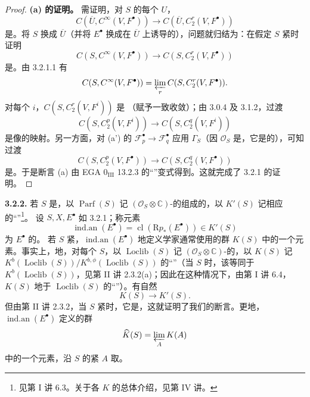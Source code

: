 \begin{proof}
\textbf{(a) 的证明。} 需证明，对 $S$ 的每个 $U$，
\[C(\overline U,C^\infty(V,F^\bullet))\longrightarrow C(\overline U,C_2^r(V,F^\bullet))\]
是。将 $S$ 换成 $\overline U$（并将 $E^\bullet$ 换成在 $\overline U$ 上诱导的），问题就归结为：在假定 $S$ 紧时证明
\[C(S,C^\infty(V,F^\bullet))\longrightarrow C(S,C_2^r(V,F^\bullet))\]
是。由 3.2.1.1 有
\[C(S,C^\infty(V,F^\bullet))=\varprojlim_r C(S,C_2^r(V,F^\bullet)).\]
对每个 $i$，$C(S,C_2^r(V,F^i))$ 是 （赋予一致收敛）；由 3.0.4 及 3.1.2，过渡
\[C(S,C_2^p(V,F^i))\longrightarrow C(S,C_2^q(V,F^i))\]
是像的映射。另一方面，对 (a') 的 $\mathcal F_p^\bullet\to\mathcal F_q^\bullet$ 应用 $\Gamma_S$（因 $\mathcal O_S$ 是，它是的），可知过渡
\[C(S,C_2^p(V,F^\bullet))\longrightarrow C(S,C_2^q(V,F^\bullet))\]
是。于是断言 (a) 由 EGA $0_{\mathrm{III}}$ 13.2.3 的“”变式得到。这就完成了 3.2.1 的证明。
\end{proof}

\textbf{3.2.2.} 若 $S$ 是，以 $\operatorname{Parf}(S)$ 记 $(\mathcal O_S\otimes\mathbb C)$-的组成的，以 $K'(S)$ 记相应的“”\footnote{见第 I 讲 6.3。关于各 $K$ 的总体介绍，见第 IV 讲。}。
设 $S,X,E^\bullet$ 如 3.2.1；称元素
\[\operatorname{ind.an}(E^\bullet)=\operatorname{cl}(\mathrm Rp_*(E^\bullet))\in K'(S)\]
为 $E^\bullet$ 的。
若 $S$ 紧，$\operatorname{ind.an}(E^\bullet)$ 地定义学家通常使用的群 $K(S)$ 中的一个元素。事实上，地，对每个 $S$，以 $\operatorname{Loclib}(S)$ 记 $(\mathcal O_S\otimes\mathbb C)$-的，以 $K(S)$ 记 $K^b(\operatorname{Loclib}(S))/K^{b,\phi}(\operatorname{Loclib}(S))$ 的“”（当 $S$ 时，该等同于 $K^b(\operatorname{Loclib}(S))$，见第 II 讲 2.3.2(a)；因此在这种情况下，由第 I 讲 6.4，$K(S)$ 地于 $\operatorname{Loclib}(S)$ 的“”）。有自然
\[K(S)\longrightarrow K'(S).\]
但由第 II 讲 2.3.2，当 $S$ 紧时，它是，这就证明了我们的断言。更地，$\operatorname{ind.an}(E^\bullet)$ 定义的群
\[\widehat K(S)=\varprojlim_A K(A)\]
中的一个元素，沿 $S$ 的紧 $A$ 取。


